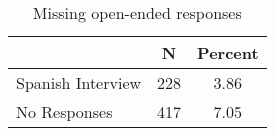 \begin{table}[ht]
\centering
\begin{tabular}{lcc}
  \hline
 & N & Percent \\ 
  \hline
Spanish Interview & 228 & 3.86 \\ 
  No Responses & 417 & 7.05 \\ 
   \hline
\end{tabular}
\caption{Missing open-ended responses} 
\label{tab:app_mis}
\end{table}
